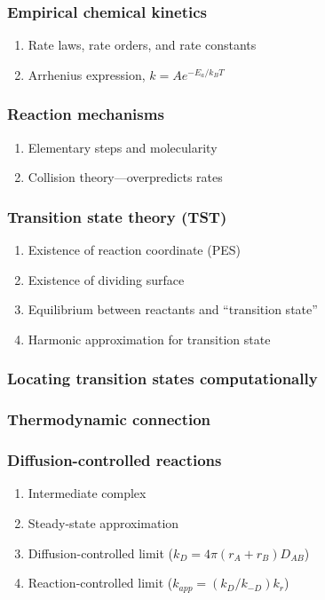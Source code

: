 \documentclass[11pt]{article}
\begin{document}
\subsubsection{Empirical chemical kinetics}
\label{sec:orgf57355f}
\begin{enumerate}
\item Rate laws, rate orders, and rate constants
\item Arrhenius expression, \(k=A e^{-E_a/k_BT}\)
\end{enumerate}
\subsubsection{Reaction mechanisms}
\label{sec:org7d1e3e5}
\begin{enumerate}
\item Elementary steps and molecularity
\item Collision theory---overpredicts rates
\end{enumerate}
\subsubsection{Transition state theory (TST)}
\label{sec:org2725df6}
\begin{enumerate}
\item Existence of reaction coordinate (PES)
\item Existence of dividing surface
\item Equilibrium between reactants and ``transition state''
\item Harmonic approximation for transition state
\end{enumerate}
\subsubsection{Locating transition states computationally}
\label{sec:org54967ba}
\subsubsection{Thermodynamic connection}
\label{sec:orgdfafb3e}
\subsubsection{Diffusion-controlled reactions}
\label{sec:orgf0ad6dd}
\begin{enumerate}
\item Intermediate complex
\item Steady-state approximation
\item Diffusion-controlled limit (\(k_D = 4\pi (r_A + r_B) D_{AB}\))
\item Reaction-controlled limit (\(k_{app}=(k_D/k_{-D})k_r\))
\end{enumerate}
\end{document}
